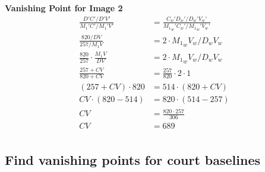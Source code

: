 \documentclass[12pt, oneside]{article}
\begin{document}
\textbf{Vanishing Point for Image 2}
\begin{align*}
  \frac{D'C'/D'V'}{{M_1}'C'/{M_1}'V'} &= \frac{{C_w}'{D_w}'/{D_w}'{V_w}'}
                                        {{{M_1}_w}'{C_w}'/{{M_1}_w}'{V_w}'} \\
  \frac{820/DV}{257/M_1V}                 &= 2 \cdot {M_1}_wV_w/D_wV_w \\
  \frac{820}{257}\cdot \frac{M_1V}{DV}    &= 2 \cdot {M_1}_wV_w/D_wV_w \\
  \frac{257 + CV}{820 + CV}   &= \frac{257}{820}\cdot 2 \cdot 1 \\
  (257 + CV) \cdot 820   &= 514 \cdot (820 + CV) \\
  CV \cdot (820 - 514)   &= 820 \cdot (514 - 257)\\
  CV  &= \frac{820 \cdot 257} {306}\\
  CV  &= 689\\
\end{align*}

\subsection{Find vanishing points for court baselines}
\end{document}
